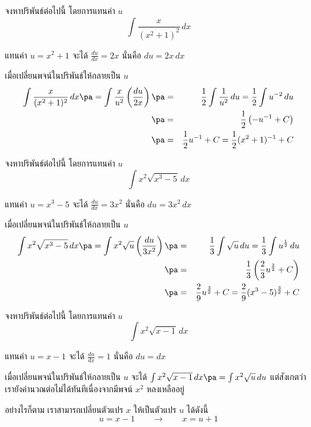 \begin{frame}[t]
\begin{ex}
จงหาปริพันธ์ต่อไปนี้ โดยการแทนค่า $u$
\[\int  \frac{x}{(x^2+1)^2}\,dx\]
\end{ex}
\begin{sol}
แทนค่า $u = x^2+1$ จะได้ \pa $\frac{du}{dx} = 2x$ \pa นั่นคือ $du = 2x\, dx$ \pa

เมื่อเปลี่ยนพจน์ในปริพันธ์ให้กลายเป็น $u$  \pa
\begin{eqnarray*}
\int \frac{x}{(x^2+1)^2} \, dx \pa = \int \frac{x}{u^2} \left(\frac{du}{2x} \right) \pa &=& \frac{1}{2} \int \frac{1}{u^2} \, du = \frac{1}{2} \int u^{-2} \, du \\
\pa &=& \frac{1}{2} \left( - u^{-1} + C \right) \\
\pa &=& \frac{1}{2}u^{-1} + C = \frac{1}{2}(x^2+1)^{-1} + C
\end{eqnarray*}
\end{sol}
\end{frame}



\begin{frame}[t]
\begin{ex}
จงหาปริพันธ์ต่อไปนี้ โดยการแทนค่า $u$
\[\int  x^2 \sqrt{x^3-5} \, dx\]
\end{ex}
\begin{sol}
แทนค่า $u = x^3-5$ จะได้ \pa $\frac{du}{dx} = 3x^2$ \pa นั่นคือ $du = 3x^2\, dx$ \pa

เมื่อเปลี่ยนพจน์ในปริพันธ์ให้กลายเป็น $u$  \pa
\begin{eqnarray*}
\int x^2 \sqrt{x^3-5}\, dx \pa = \int x^2 \sqrt{u} \left(\frac{du}{3x^2} \right) \pa &=& \frac{1}{3} \int \sqrt{u}\, du = \frac{1}{3} \int u^{\frac{1}{2}}\, du \\
\pa &=& \frac{1}{3} \left( \frac{2}{3} u^{\frac{3}{2}} + C \right)  \\
\pa &=& \frac{2}{9} u^{\frac{3}{2}} + C = \frac{2}{9}(x^3-5)^{\frac{3}{2}} + C
\end{eqnarray*}
\end{sol}
\end{frame}

\begin{frame}[t]
\begin{ex}
จงหาปริพันธ์ต่อไปนี้ โดยการแทนค่า $u$
\[\int  x^2 \sqrt{x-1} \, dx\]
\end{ex}
\begin{sol}
แทนค่า $u = x-1$ จะได้ \pa $\frac{du}{dx} = 1$ \pa นั่นคือ $du = dx$ \pa

เมื่อเปลี่ยนพจน์ในปริพันธ์ให้กลายเป็น $u$ จะได้ $\int x^2 \sqrt{x-1}\, dx \pa = \int x^2 \sqrt{u} \, du$ แต่สังเกตว่าเรายังคำนวณต่อไม่ได้ทันทีเนื่องจากมีพจน์ $x^2$ หลงเหลืออยู่

อย่างไรก็ตาม เราสามารถเปลี่ยนตัวแปร $x$ ให้เป็นตัวแปร $u$ ได้ดังนี้
\[ u = x-1 \qquad \rightarrow \qquad x = u+1 \]
\end{sol}
\end{frame}


